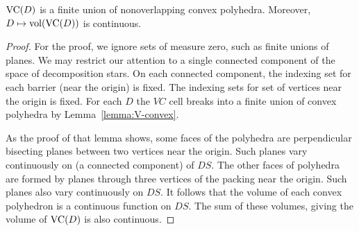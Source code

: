 \begin{lemma}\label{lemma:vc-cont}
${\operatorname{VC}}(D)$ is a finite union of nonoverlapping convex polyhedra.
Moreover, $D\mapsto{\operatorname{vol}}({\operatorname{VC}}(D))$ is continuous.
\end{lemma}

\begin{proof}  For the proof, we ignore sets of measure zero,
such as finite unions of planes.  We may restrict our attention to
a single connected component of the space of decomposition stars.
On each connected component, the indexing set for each barrier
(near the origin) is fixed. The indexing sets for set of vertices
near the origin is fixed.  For each $D$ the $VC$ cell breaks into
a finite union of convex polyhedra by Lemma~\ref{lemma:V-convex}.

As the proof of that lemma shows,  some faces of the polyhedra
are perpendicular bisecting planes between two vertices near the
origin.  Such planes vary continuously on (a connected component)
of $DS$.  The other faces of polyhedra are formed by planes
through three vertices of the packing near the origin.  Such
planes also vary continuously on $DS$.  It follows that the volume
of each convex polyhedron is a continuous function on $DS$.  The
sum of these volumes, giving the volume of ${\operatorname{VC}}(D)$ is also
continuous.
\end{proof}



